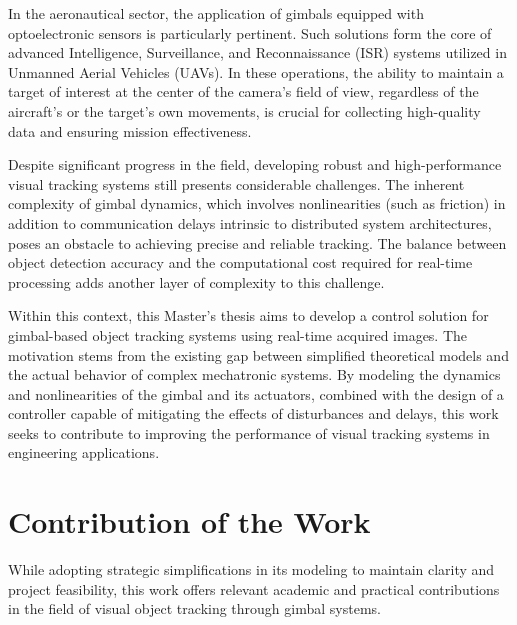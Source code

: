 In the aeronautical sector, the application of gimbals equipped with optoelectronic sensors is particularly pertinent. Such solutions form the core of advanced Intelligence, Surveillance, and Reconnaissance (ISR) systems utilized in Unmanned Aerial Vehicles (UAVs). In these operations, the ability to maintain a target of interest at the center of the camera's field of view, regardless of the aircraft's or the target's own movements, is crucial for collecting high-quality data and ensuring mission effectiveness.

Despite significant progress in the field, developing robust and high-performance visual tracking systems still presents considerable challenges. The inherent complexity of gimbal dynamics, which involves nonlinearities (such as friction) in addition to communication delays intrinsic to distributed system architectures, poses an obstacle to achieving precise and reliable tracking. The balance between object detection accuracy and the computational cost required for real-time processing adds another layer of complexity to this challenge.

Within this context, this Master's thesis aims to develop a control solution for gimbal-based object tracking systems using real-time acquired images. The motivation stems from the existing gap between simplified theoretical models and the actual behavior of complex mechatronic systems. By modeling the dynamics and nonlinearities of the gimbal and its actuators, combined with the design of a controller capable of mitigating the effects of disturbances and delays, this work seeks to contribute to improving the performance of visual tracking systems in engineering applications.

\section{Contribution of the Work}

While adopting strategic simplifications in its modeling to maintain clarity and project feasibility, this work offers relevant academic and practical contributions in the field of visual object tracking through gimbal systems. 

